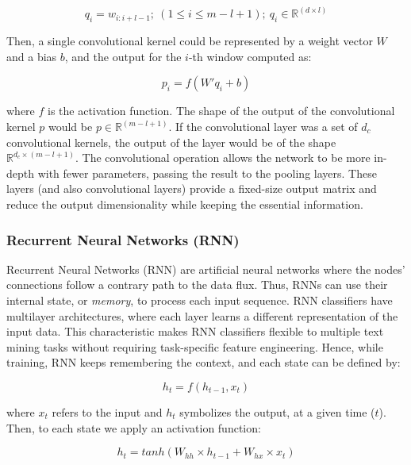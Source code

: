 \begin{equation}
    q_i = w_{i:i+l-1};\ (1 \leq i \leq m-l+1);\ q_i \in \mathbb{R}^{(d \times l)}
\end{equation}

Then, a single convolutional kernel could be represented by a weight vector $W$ and a bias $b$, and the output for the $i$-th window computed as:

\begin{equation}
    p_i= f (W'q_i+b)
\end{equation}

where $f$ is the activation function. The shape of the output of the convolutional kernel $p$ would be $p \in \mathbb{R} ^{(m-l+1)}$. If the convolutional layer was a set of $d_c$ convolutional kernels, the output of the layer would be of the shape $\mathbb{R} ^{d_c \times (m-l+1)}$.
The convolutional operation allows the network to be more in-depth with fewer parameters, passing the result to the pooling layers. These layers (and also convolutional layers) provide a fixed-size output matrix and reduce the output dimensionality while keeping the essential information. 

\hypertarget{2.1.4.2}{\subsubsection{Recurrent Neural Networks (RNN)}}

Recurrent Neural Networks (RNN) are artificial neural networks where the nodes' connections follow a contrary path to the data flux. Thus, RNNs can use their internal state, or \textit{memory}, to process each input sequence. 
RNN classifiers have multilayer architectures, where each layer learns a different representation of the input data. This characteristic makes RNN classifiers flexible to multiple text mining tasks without requiring task-specific feature engineering. Hence, while training, RNN keeps remembering the context, and each state can be defined by:

\begin{equation}
    h_t = f(h_{t-1}, x_t)
\end{equation}

where $x_t$ refers to the input and $h_t$ symbolizes the output, at a given time ($t$). Then, to each state we apply an activation function:

\begin{equation}
    h_t = tanh(W_{hh} \times h_{t-1} + W_{hx} \times x_t)
\end{equation}


